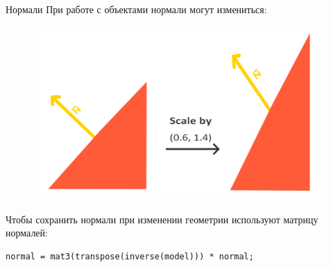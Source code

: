 \documentclass[aspectration=1610,t]{beamer}
\begin{document}
\begin{frame}[fragile]{Нормали}
    При работе с объектами нормали могут измениться:
    \begin{figure}[htp]
        \centering
        \includegraphics[scale=0.30]{res/norm}
    \end{figure}
    Чтобы сохранить нормали при изменении геометрии используют матрицу нормалей:
    {\small \begin{lstlisting}
normal = mat3(transpose(inverse(model))) * normal;
    \end{lstlisting}}
\end{frame}
\end{document}
